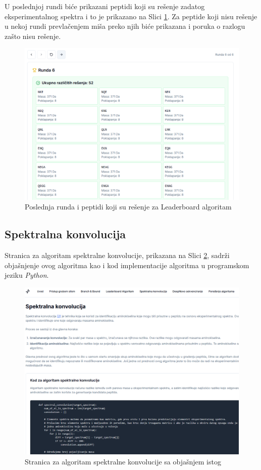 \documentclass[12pt,oneside]{memoir}
\begin{document}
U poslednjoj rundi biće prikazani peptidi koji su rešenje zadatog eksperimentalnog spektra i to je prikazano na Slici \ref{fig:leaderboard_3}. Za peptide koji nisu rešenje u nekoj rundi prevlačenjem miša preko njih biće prikazana i poruka o razlogu zašto nisu rešenje.
\begin{figure}[H]
\centering
\includegraphics[width=1\textwidth]{images/leaderboard_3.png}
\caption{Poslednja runda i peptidi koji su rešenje za Leaderboard algoritam}
\label{fig:leaderboard_3}
\end{figure}

\subsection{Spektralna konvolucija}
Stranica za algoritam spektralne konvolucije, prikazana na Slici \ref{fig:convolution_1}, sadrži objašnjenje ovog algoritma kao i kod implementacije algoritma u programskom jeziku \emph{Python}.
\begin{figure}[H]
\centering
\includegraphics[width=1\textwidth]{images/convolution_1.png}
\caption{Stranica za algoritam spektralne konvolucije sa objašnjem istog}
\label{fig:convolution_1}
\end{figure}
\end{document}
